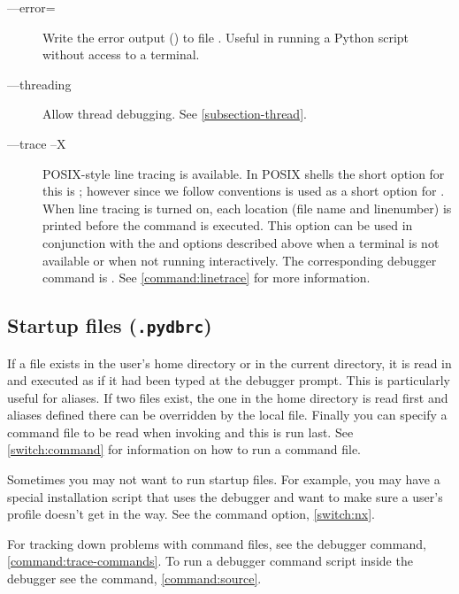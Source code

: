 \begin{description}
\item[--{}--error=]

Write the error output
() to file . Useful in
 running a Python script without access to a terminal.

\item[--{}--threading]\label{switch:threading}
Allow thread debugging. See \ref{subsection-thread}.

\item[--{}--trace \code{\Large{|}}--X]\label{switch:trace}

POSIX-style line tracing is available. In POSIX shells the short
option for this is ; however since we follow 
conventions  is used as a short option for
. When line tracing is turned on, each location (file
name and linenumber) is printed before the command is executed. This
option can be used in conjunction with the  and
 options described above when a terminal is not
available or when not running interactively. The corresponding
debugger command is . See
\ref{command:linetrace} for more information.

\end{description}

\subsection{Startup files ({\tt .pydbrc})\label{subsection-startup-files}}

If a file 
 exists
in the user's home directory or in the current directory, it is read
in and executed as if it had been typed at the debugger prompt.  This
is particularly useful for aliases.  If two files exist, the one in
the home directory is read first and aliases defined there can be
overridden by the local file. Finally you can specify a command file
to be read when invoking  and this is run last. See
\ref{switch:command} for information on how to run a command file.

Sometimes you may not want to run startup files. For example,
you may have a special installation script that uses the debugger and
want to make sure a user's profile doesn't get in the way. See
the  command option, \ref{switch:nx}.

For tracking down problems with command files, see the  debugger command, \ref{command:trace-commands}. To run a
debugger command script inside the debugger see the 
command, \ref{command:source}.

